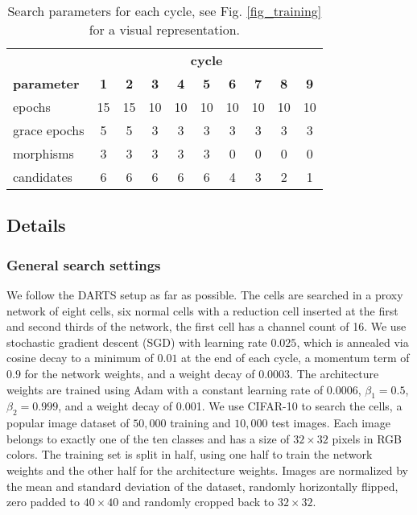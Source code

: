 \documentclass[conference]{IEEEtran}
\begin{document}
\begin{table}[htbp]
	\caption{Search parameters for each cycle, see Fig. \ref{fig_training} for a visual representation.}
	
	\centering
	\begin{center}
		\begin{tabular}{ l  c c c  c c c c c c }
			\toprule
			& \multicolumn{9}{c}{\textbf{cycle}} \\
			\cmidrule(r){2-10}
			\textbf{\textbf{parameter}} & \textbf{1} & \textbf{2} & \textbf{3} & \textbf{4} & \textbf{5} & \textbf{6} & \textbf{7} & \textbf{8} & \textbf{9} \\
			\midrule
			epochs 			& 15 & 15 & 10 & 10 & 10 & 10 & 10 & 10 & 10 \\
			grace epochs 	& 5  & 5  & 3  & 3  & 3  & 3  & 3  & 3  & 3  \\
			morphisms		& 3  & 3  & 3  & 3  & 3  & 0  & 0  & 0  & 0  \\
			candidates		& 6  & 6  & 6  & 6  & 6  & 4  & 3  & 2  & 1  \\
			\bottomrule
		\end{tabular}
		\label{tab_search}
	\end{center}
\end{table}





\subsection{Details}
\label{ss_experiments_details}

\subsubsection*{General search settings}

We follow the DARTS setup as far as possible.
The cells are searched in a proxy network of eight cells, six normal cells with a reduction cell inserted at the first and second thirds of the network, the first cell has a channel count of 16.
We use stochastic gradient descent (SGD) with learning rate $0.025$, which is annealed via cosine decay to a minimum of $0.01$ at the end of each cycle, a momentum term of $0.9$ for the network weights, and a weight decay of $0.0003$.
The architecture weights are trained using Adam \cite{etc_adam} with a constant learning rate of $0.0006$, $\beta _1 = 0.5$, $\beta_2 = 0.999$, and a weight decay of 0.001.
We use CIFAR-10 \cite{etc_cifar} to search the cells, a popular image dataset of $50,000$  training and $10,000$ test images. Each image belongs to exactly one of the ten classes and has a size of $32 \times 32$ pixels in RGB colors. The training set is split in half, using one half to train the network weights and the other half for the architecture weights. Images are normalized by the mean and standard deviation of the dataset, randomly horizontally flipped, zero padded to $40 \times 40$ and randomly cropped back to $32 \times 32$.
\end{document}
